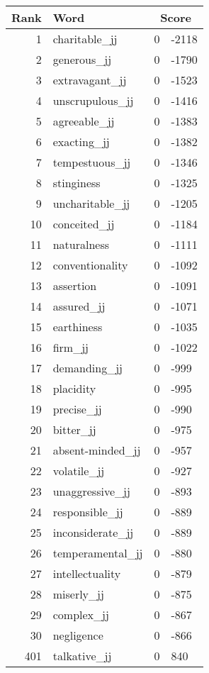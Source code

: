 \begin{longtable}[!htbp]{| rlr@{.}l |}
    \hline
    \textbf{Rank} & \textbf{Word} & \multicolumn{2}{c|}{\textbf{Score}} \\
    \hline
    \endhead
    1 & charitable\_jj & 0 & -2118 \\
    2 & generous\_jj & 0 & -1790 \\
    3 & extravagant\_jj & 0 & -1523 \\
    4 & unscrupulous\_jj & 0 & -1416 \\
    5 & agreeable\_jj & 0 & -1383 \\
    6 & exacting\_jj & 0 & -1382 \\
    7 & tempestuous\_jj & 0 & -1346 \\
    8 & stinginess & 0 & -1325 \\
    9 & uncharitable\_jj & 0 & -1205 \\
    10 & conceited\_jj & 0 & -1184 \\
    11 & naturalness & 0 & -1111 \\
    12 & conventionality & 0 & -1092 \\
    13 & assertion & 0 & -1091 \\
    14 & assured\_jj & 0 & -1071 \\
    15 & earthiness & 0 & -1035 \\
    16 & firm\_jj & 0 & -1022 \\
    17 & demanding\_jj & 0 & -999 \\
    18 & placidity & 0 & -995 \\
    19 & precise\_jj & 0 & -990 \\
    20 & bitter\_jj & 0 & -975 \\
    21 & absent-minded\_jj & 0 & -957 \\
    22 & volatile\_jj & 0 & -927 \\
    23 & unaggressive\_jj & 0 & -893 \\
    24 & responsible\_jj & 0 & -889 \\
    25 & inconsiderate\_jj & 0 & -889 \\
    26 & temperamental\_jj & 0 & -880 \\
    27 & intellectuality & 0 & -879 \\
    28 & miserly\_jj & 0 & -875 \\
    29 & complex\_jj & 0 & -867 \\
    30 & negligence & 0 & -866 \\
    401 & talkative\_jj & 0 & 840 \\

\end{longtable}
